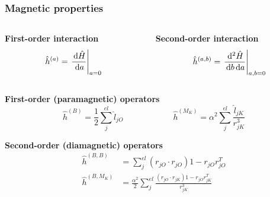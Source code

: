 \begin{frame}
\frametitle{Magnetic properties}

\begin{columns}
\begin{column}[b]{0.48\linewidth}
    \centering
    \textbf{First-order interaction}
    \begin{equation}
        \nonumber
        \hat{h}^{(a)} = 
        \left. \frac{\,\mathrm{d} \hat{H}}{\,\mathrm{d} a}\right|_{a=0}
    \end{equation}
\end{column}

\begin{column}[b]{0.48\linewidth}
    \centering
    \textbf{Second-order interaction}
    \begin{equation}
        \nonumber
        \hat{h}^{(a,b)} = 
        \left. \frac{\,\mathrm{d}^2 \hat{H}}{\,\mathrm{d} b \,\mathrm{d} a}\right|_{a,b=0}
    \end{equation}
\end{column}
\end{columns}

\vspace{5mm}

\centering
\textbf{First-order (paramagnetic) operators}
\begin{equation}
    \nonumber
    \hat{h}^{(B)} = \frac{1}{2}\sum_j^{el} \hat{l}_{jO} \qquad \qquad \qquad
    \hat{h}^{(M_K)} = \alpha^2 \sum_j^{el} \frac{\hat{l}_{jK}}{r_{jK}^3}
\end{equation}

\vspace{5mm}

\textbf{Second-order (diamagnetic) operators}
\begin{align}
    \nonumber
    \hat{h}^{(B,B)} &= 
    \sum_j^{el} \left(r_{jO}\cdot r_{jO}\right)1 - r_{jO}r_{jO}^T\\
    \nonumber
    \hat{h}^{(B,M_K)} &= \frac{\alpha^2}{2} 
    \sum_j^{el} \frac{\left(r_{jO}\cdot r_{jK}\right)1 -
    r_{jO}r_{jK}^T}{r_{jK}^3}
\end{align}

\end{frame}

